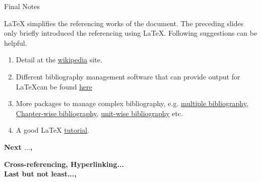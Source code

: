 \begin{frame}{Final Notes}

\justifying

\LaTeX{} simplifies the referencing works of the document. The preceding slides only briefly introduced the referencing using \LaTeX. Following suggestions can be helpful.

\begin{enumerate}

\item Detail at the \href{http://en.wikibooks.org/wiki/LaTeX/Bibliography_Management}{wikipedia} site.\\
\vspace{0.2cm}

\item Different bibliography management software that can provide output for \LaTeX can be found \href{http://en.wikipedia.org/wiki/Comparison_of_reference_management_software}{here}\\
\vspace{0.2cm}

\item More packages to manage complex bibliography, e.g. \href{http://ctan.org/pkg/multibib}{multiple bibliography}, \href{http://ctan.org/pkg/chapterbib}{Chapter-wise bibliography}, \href{http://ctan.org/pkg/bibunits}{unit-wise bibliography} etc.

\item A good \LaTeX{} \href{http://www.sharelatex.com/learn/Main_Page}{tutorial}.

\end{enumerate} 


\end{frame}

{
\begin{frame}{ \textbf{Next $\ldots$,}}
\pagestyle{plain}
\Huge

\textbf{Cross-referencing, Hyperlinking... \\ \vspace{0.5cm}Last but not least...,}


\end{frame}


}








